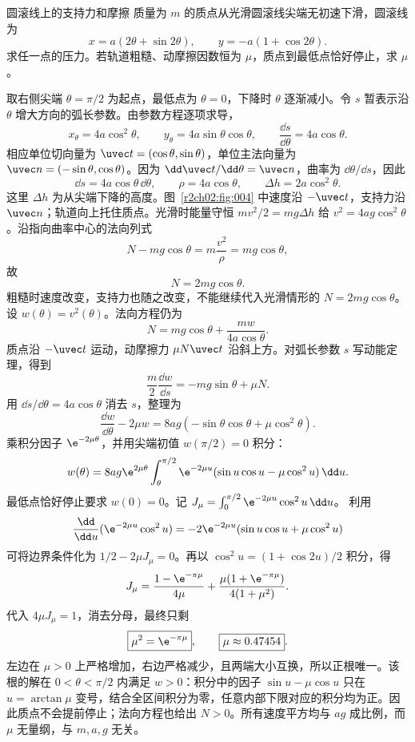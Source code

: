 \begin{practicebox}{圆滚线上的支持力和摩擦}
质量为 $m$ 的质点从光滑圆滚线尖端无初速下滑，圆滚线为
\[
 x=a(2\theta+\sin2\theta),\qquad y=-a(1+\cos2\theta).
\]
求任一点的压力。若轨道粗糙、动摩擦因数恒为 $\mu$，质点到最低点恰好停止，求 $\mu$。
\label{r2ch02:pr:003}
\begin{solution}
取右侧尖端 $\theta=\pi/2$ 为起点，最低点为 $\theta=0$，下降时 $\theta$ 逐渐减小。令 $s$ 暂表示沿 $\theta$ 增大方向的弧长参数。由参数方程逐项求导，
\[
 x_\theta=4a\cos^2\theta,\qquad
 y_\theta=4a\sin\theta\cos\theta,
 \qquad \frac{\dd s}{\dd\theta}=4a\cos\theta.
\]
相应单位切向量为 $\uvec t=(\cos\theta,\sin\theta)$，单位主法向量为
$\uvec n=(-\sin\theta,\cos\theta)$。因为 $\dd\uvec t/\dd\theta=\uvec n$，曲率为 $\dd\theta/\dd s$，因此
\[
 \dd s=4a\cos\theta\,\dd\theta,\qquad \rho=4a\cos\theta,\qquad
 \Delta h=2a\cos^2\theta.
\]
这里 $\Delta h$ 为从尖端下降的高度。图~\ref{r2ch02:fig:004} 中速度沿 $-\uvec t$，支持力沿 $\uvec n$；轨道向上托住质点。光滑时能量守恒 $mv^2/2=mg\Delta h$ 给 $v^2=4ag\cos^2\theta$。沿指向曲率中心的法向列式
\[
 N-mg\cos\theta=m\frac{v^2}{\rho}=mg\cos\theta,
\]
故
\[
 \boxed{N=2mg\cos\theta}.
\]
\figCycloidForce
粗糙时速度改变，支持力也随之改变，不能继续代入光滑情形的 $N=2mg\cos\theta$。设 $w(\theta)=v^2(\theta)$。法向方程仍为
\[
 N=mg\cos\theta+\frac{mw}{4a\cos\theta}.
\]
质点沿 $-\uvec t$ 运动，动摩擦力 $\mu N\uvec t$ 沿斜上方。对弧长参数 $s$ 写动能定理，得到
\[
 \frac m2\frac{\dd w}{\dd s}=-mg\sin\theta+\mu N.
\]
用 $\dd s/\dd\theta=4a\cos\theta$ 消去 $s$，整理为
\[
 \frac{\dd w}{\dd\theta}-2\mu w
 =8ag(-\sin\theta\cos\theta+\mu\cos^2\theta).
\]
乘积分因子 $\e^{-2\mu\theta}$，并用尖端初值 $w(\pi/2)=0$ 积分：
\[
 w(\theta)=8ag\e^{2\mu\theta}
 \int_\theta^{\pi/2}\e^{-2\mu u}
 (\sin u\cos u-\mu\cos^2u)\,\dd u.
\]
最低点恰好停止要求 $w(0)=0$。记
$J_\mu=\int_0^{\pi/2}\e^{-2\mu u}\cos^2u\,\dd u$。
利用
\[
 \frac{\dd}{\dd u}(\e^{-2\mu u}\cos^2u)
 =-2\e^{-2\mu u}(\sin u\cos u+\mu\cos^2u)
\]
可将边界条件化为 $1/2-2\mu J_\mu=0$。再以
$\cos^2u=(1+\cos2u)/2$ 积分，得
\[
 J_\mu=\frac{1-\e^{-\pi\mu}}{4\mu}
       +\frac{\mu(1+\e^{-\pi\mu})}{4(1+\mu^2)}.
\]
代入 $4\mu J_\mu=1$，消去分母，最终只剩
\[
 \boxed{\mu^2=\e^{-\pi\mu}},\qquad
 \boxed{\mu\approx0.47454}.
\]
左边在 $\mu>0$ 上严格增加，右边严格减少，且两端大小互换，所以正根唯一。该根的解在 $0<\theta<\pi/2$ 内满足 $w>0$：积分中的因子 $\sin u-\mu\cos u$ 只在 $u=\arctan\mu$ 变号，结合全区间积分为零，任意内部下限对应的积分均为正。因此质点不会提前停止；法向方程也给出 $N>0$。所有速度平方均与 $ag$ 成比例，而 $\mu$ 无量纲，与 $m,a,g$ 无关。
\end{solution}
\end{practicebox}

